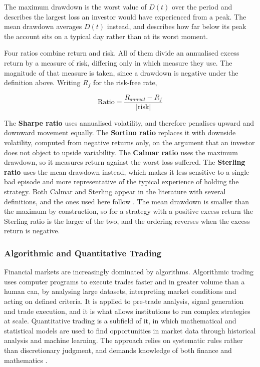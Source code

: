The maximum drawdown is the worst value of $D(t)$ over the period and describes the largest loss an investor would have experienced from a peak. The mean drawdown averages $D(t)$ instead, and describes how far below its peak the account sits on a typical day rather than at its worst moment.

Four ratios combine return and risk. All of them divide an annualised excess return by a measure of risk, differing only in which measure they use. The magnitude of that measure is taken, since a drawdown is negative under the definition above. Writing $R_f$ for the risk-free rate,

\begin{equation}
\text{Ratio} = \frac{R_{annual} - R_f}{\left| \text{risk} \right|}
\label{Equation:RiskRatio}
\end{equation}

The \textbf{Sharpe ratio} \cite{sharpe_sharpe_1994} uses annualised volatility, and therefore penalises upward and downward movement equally. The \textbf{Sortino ratio} \cite{sortino_performance_1994} replaces it with downside volatility, computed from negative returns only, on the argument that an investor does not object to upside variability. The \textbf{Calmar ratio} uses the maximum drawdown, so it measures return against the worst loss suffered. The \textbf{Sterling ratio} uses the mean drawdown instead, which makes it less sensitive to a single bad episode and more representative of the typical experience of holding the strategy. Both Calmar and Sterling appear in the literature with several definitions, and the ones used here follow \cite{bacon_practical_2023}. The mean drawdown is smaller than the maximum by construction, so for a strategy with a positive excess return the Sterling ratio is the larger of the two, and the ordering reverses when the excess return is negative.

\subsubsection{Algorithmic and Quantitative Trading}

Financial markets are increasingly dominated by algorithms. Algorithmic trading uses computer programs to execute trades faster and in greater volume than a human can, by analysing large datasets, interpreting market conditions and acting on defined criteria. It is applied to pre-trade analysis, signal generation and trade execution, and it is what allows institutions to run complex strategies at scale. Quantitative trading is a subfield of it, in which mathematical and statistical models are used to find opportunities in market data through historical analysis and machine learning. The approach relies on systematic rules rather than discretionary judgment, and demands knowledge of both finance and mathematics \cite{chan_quantitative_2021}.

